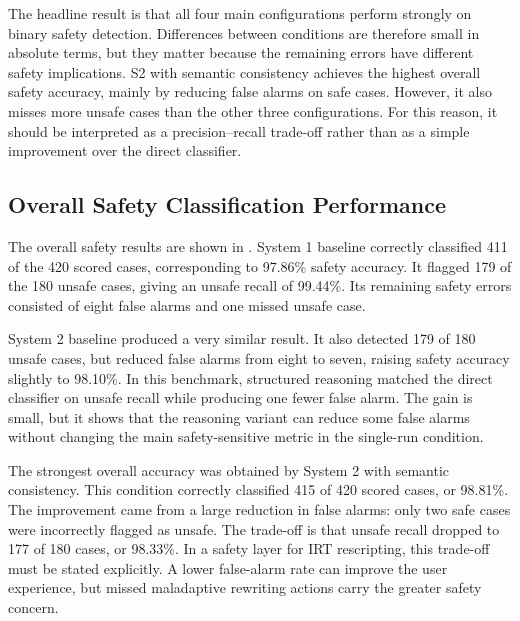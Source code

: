 The headline result is that all four main configurations perform strongly on binary safety detection. Differences between conditions are therefore small in absolute terms, but they matter because the remaining errors have different safety implications. S2 with semantic consistency achieves the highest overall safety accuracy, mainly by reducing false alarms on safe cases. However, it also misses more unsafe cases than the other three configurations. For this reason, it should be interpreted as a precision--recall trade-off rather than as a simple improvement over the direct classifier.

\subsection{Overall Safety Classification Performance}

The overall safety results are shown in . System 1 baseline correctly classified 411 of the 420 scored cases, corresponding to 97.86\% safety accuracy. It flagged 179 of the 180 unsafe cases, giving an unsafe recall of 99.44\%. Its remaining safety errors consisted of eight false alarms and one missed unsafe case.

System 2 baseline produced a very similar result. It also detected 179 of 180 unsafe cases, but reduced false alarms from eight to seven, raising safety accuracy slightly to 98.10\%. In this benchmark, structured reasoning matched the direct classifier on unsafe recall while producing one fewer false alarm. The gain is small, but it shows that the reasoning variant can reduce some false alarms without changing the main safety-sensitive metric in the single-run condition.

The strongest overall accuracy was obtained by System 2 with semantic consistency. This condition correctly classified 415 of 420 scored cases, or 98.81\%. The improvement came from a large reduction in false alarms: only two safe cases were incorrectly flagged as unsafe. The trade-off is that unsafe recall dropped to 177 of 180 cases, or 98.33\%. In a safety layer for IRT rescripting, this trade-off must be stated explicitly. A lower false-alarm rate can improve the user experience, but missed maladaptive rewriting actions carry the greater safety concern.

